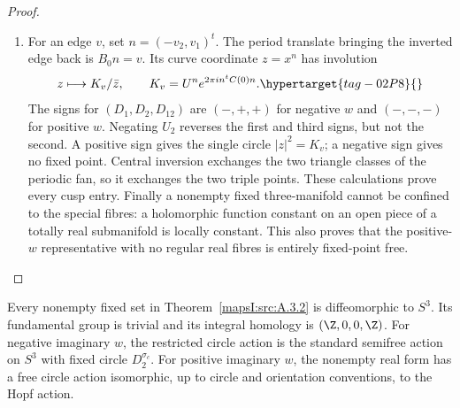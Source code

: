 \begin{proof}
\begin{enumerate}[label=\arabic*.,leftmargin=*]
\item For an edge $v$, set $n=(-v_2,v_1)^t$. The period translate bringing
the inverted edge back is $B_0n=v$. Its curve coordinate $z=x^n$ has
involution
\[
 z\longmapsto K_v/\bar z,
 \qquad K_v=U^n e^{2\pi i n^tC(0)n}.
 \hypertarget{tag-02P8}{}\label{mapsI:real-eq-8}
\]
The signs for $(D_1,D_2,D_{12})$ are $(-,+,+)$ for negative $w$
and $(-,-,-)$ for positive $w$. Negating $U_2$ reverses the first and
third signs, but not the second. A positive sign gives the single
circle $|z|^2=K_v$; a negative sign gives no fixed point. Central
inversion exchanges the two triangle classes of the periodic fan, so
it exchanges the two triple points. These calculations prove every
cusp entry. Finally a nonempty fixed three-manifold cannot be confined
to the special fibres: a holomorphic function constant on an open
piece of a totally real submanifold is locally constant. This also
proves that the positive-$w$ representative with no regular real
fibres is entirely fixed-point free.
\end{enumerate}
\end{proof}

\begin{theorem}\hypertarget{tag-02PG}{}\label{mapsI:src:A.3.3}

Every nonempty fixed set in Theorem~\ref{mapsI:src:A.3.2} is diffeomorphic to $S^3$.
Its fundamental group is trivial and its integral homology is
$(\Z,0,0,\Z)$. For negative imaginary $w$, the restricted circle action
is the standard semifree action on $S^3$ with fixed circle
$D_2^{\sigma_c}$. For positive imaginary $w$, the nonempty real form
has a free circle action isomorphic, up to circle and orientation
conventions, to the Hopf action.
\end{theorem}



